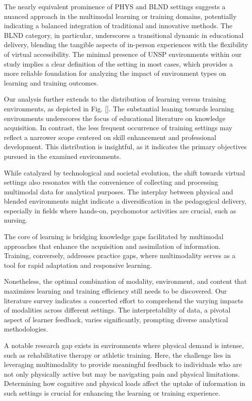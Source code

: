 \documentclass[manuscript,screen,review]{acmart}
\begin{document}
The nearly equivalent prominence of PHYS and BLND settings suggests a nuanced approach in the multimodal learning or training domains, potentially indicating a balanced integration of traditional and innovative methods. The BLND category, in particular, underscores a transitional dynamic in educational delivery, blending the tangible aspects of in-person experiences with the flexibility of virtual accessibility.
The minimal presence of UNSP environments within our study implies a clear definition of the setting in most cases, which provides a more reliable foundation for analyzing the impact of environment types on learning and training outcomes.

Our analysis further extends to the distribution of learning versus training environments, as depicted in Fig. \ref{}. The substantial leaning towards learning environments underscores the focus of educational literature on knowledge acquisition. In contrast, the less frequent occurrence of training settings may reflect a narrower scope centered on skill enhancement and professional development. This distribution is insightful, as it indicates the primary objectives pursued in the examined environments.

While catalyzed by technological and societal evolution, the shift towards virtual settings also resonates with the convenience of collecting and processing multimodal data for analytical purposes. The interplay between physical and blended environments might indicate a diversification in the pedagogical delivery, especially in fields where hands-on, psychomotor activities are crucial, such as nursing.

The core of learning is bridging knowledge gaps facilitated by multimodal approaches that enhance the acquisition and assimilation of information. Training, conversely, addresses practice gaps, where multimodality serves as a tool for rapid adaptation and responsive learning.

Nonetheless, the optimal combination of modality, environment, and content that maximizes learning and training efficiency still needs to be discovered. Our literature survey indicates a concerted effort to comprehend the varying impacts of modalities across different settings. The interpretability of data, a pivotal aspect of learner feedback, varies significantly, prompting diverse analytical methodologies.

A notable research gap exists in environments where physical demand is intense, such as rehabilitative therapy or athletic training. Here, the challenge lies in leveraging multimodality to provide meaningful feedback to individuals who are not only physically active but may be navigating pain and physical limitations. Determining how cognitive and physical loads affect the uptake of information in such settings is crucial for enhancing the learning or training experience.
\end{document}
